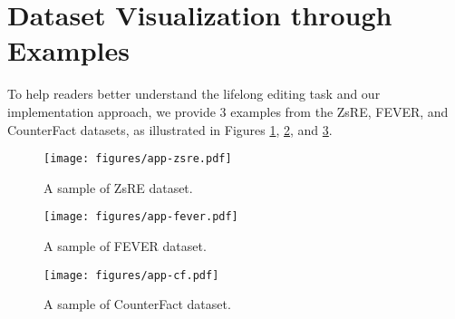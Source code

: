 \newpage

\section{Dataset Visualization through Examples}
To help readers better understand the lifelong editing task and our implementation approach, we provide 3 examples from the ZsRE, FEVER, and CounterFact datasets, as illustrated in Figures \ref{fig:zsre}, \ref{fig:fever}, and \ref{fig:cf}.

\begin{figure}[h]
    \centering
    \texttt{[image: figures/app-zsre.pdf]}
    \caption{A sample of ZsRE dataset.}
    \label{fig:zsre}
\end{figure}

\begin{figure}[h]
    \centering
    \texttt{[image: figures/app-fever.pdf]}
    \caption{A sample of FEVER dataset.}
    \label{fig:fever}
\end{figure}

\begin{figure}[h]
    \centering
    \texttt{[image: figures/app-cf.pdf]}
    \caption{A sample of CounterFact dataset.}
    \label{fig:cf}
\end{figure}
